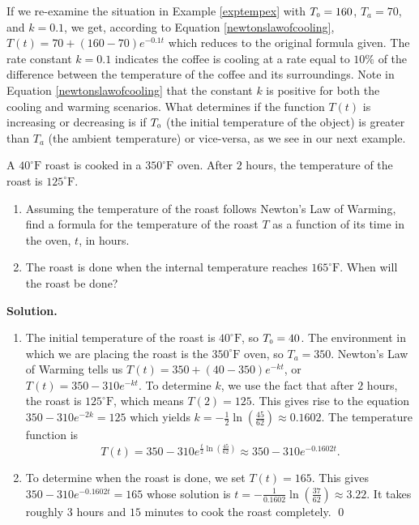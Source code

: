 \smallskip 

If we re-examine the situation in Example \ref{exptempex} with $T_{\mbox{\tiny$0$}} = 160$, $T_{a} = 70$, and $k = 0.1$, we get, according to Equation \ref{newtonslawofcooling}, $T(t) = 70 + (160 - 70)e^{-0.1t}$ which reduces to the original formula given.  The rate constant $k = 0.1$ indicates the coffee is cooling at a rate equal to $10 \%$ of the difference between the temperature of the coffee and its surroundings.  Note in Equation \ref{newtonslawofcooling} that the constant $k$ is positive for both the cooling and warming scenarios.  What determines if the function $T(t)$ is increasing or decreasing is if $T_{\mbox{\tiny$0$}}$ (the initial temperature of the object) is greater than $T_{a}$ (the ambient temperature) or vice-versa, as we see in our next example.

\begin{ex} \label{exptempex2} A $40^{\circ}\mbox{F}$ roast is cooked in a $350^{\circ}\mbox{F}$ oven.  After $2$ hours, the temperature of the roast is $125^{\circ}\mbox{F}$.

\begin{enumerate}

\item  Assuming the temperature of the roast follows Newton's Law of Warming, find a formula for the temperature of the roast $T$ as a function of its time in the oven, $t$, in hours.

\item  The roast is done when the internal temperature reaches $165^{\circ}\mbox{F}$.  When will the roast be done?

\end{enumerate}

\smallskip

{\bf Solution.}

\begin{enumerate}

\item  The initial temperature of the roast is $40^{\circ}\mbox{F}$, so $T_{\mbox{\tiny$0$}} = 40$.  The environment in which we are placing the roast is the $350^{\circ}\mbox{F}$ oven, so $T_{a} = 350$. Newton's Law of Warming tells us $T(t) = 350 + (40-350)e^{-kt}$, or $T(t) = 350 - 310e^{-kt}$.  To determine $k$, we use the fact that after $2$ hours, the roast is  $125^{\circ}\mbox{F}$, which means $T(2) = 125$.  This gives rise to the equation $350 - 310e^{-2k} = 125$ which yields $k = -\frac{1}{2} \ln \left( \frac{45}{62}  \right) \approx 0.1602$.  The temperature function is \[T(t) = 350 - 310 e^{\frac{t}{2} \ln \left( \frac{45}{62}  \right)} \approx 350- 310 e^{-0.1602 t}.\]


\item  To determine when the roast is done, we set $T(t) = 165$.  This gives $350- 310 e^{-0.1602 t} = 165$ whose solution is $t = -\frac{1}{0.1602} \ln \left( \frac{37}{62}  \right) \approx 3.22$.  It takes roughly $3$ hours and $15$ minutes to cook the roast completely. \qed

\end{enumerate}

\end{ex}

